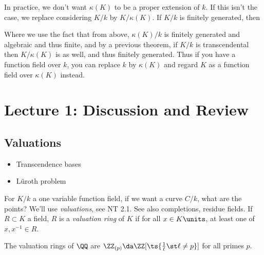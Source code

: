 \begin{remark}

In practice, we don't want \(\kappa(K)\) to be a proper extension of
\(k\). If this isn't the case, we replace considering \(K/k\) by
\(K/\kappa(K)\). If \(K/k\) is finitely generated, then

\begin{center}\end{center}

Where we use the fact that from above, \(\kappa(K)/k\) is finitely
generated and algebraic and thus finite, and by a previous theorem, if
\(K/k\) is transcendental then \(K/\kappa(K)\) is as well, and thus
finitely generated. Thus if you have a function field over \(k\), you
can replace \(k\) by \(\kappa(K)\) and regard \(K\) as a function field
over \(\kappa(K)\) instead.

\end{remark}

\hypertarget{lecture-1-discussion-and-review}{%
\section{Lecture 1: Discussion and
Review}\label{lecture-1-discussion-and-review}}

\hypertarget{valuations}{%
\subsection{Valuations}\label{valuations}}

\begin{itemize}
\tightlist
\item
  Transcendence bases
\item
  Lüroth problem
\end{itemize}

For \(K/k\) a one variable function field, if we want a curve \(C/k\),
what are the points? We'll use \emph{valuations}, see NT 2.1. See also
completions, residue fields. If \(R \subset K\) a field, \(R\) is a
\emph{valuation ring} of \(K\) if for all \(x\in K\units\), at least one
of \(x, x^{-1} \in R\).

\begin{example}

The valuation rings of \(\QQ\) are
\(\ZZ_{(p)}\da \ZZ[\ts{{1\over \ell} \st \ell\neq p}]\) for all primes
\(p\).

\end{example}

